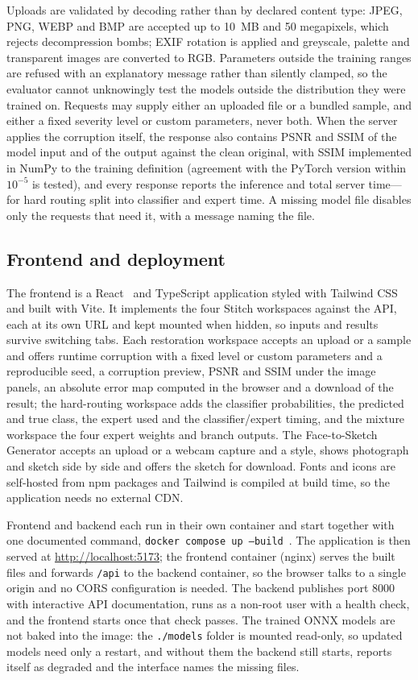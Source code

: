 \documentclass[conference]{IEEEtran}
\begin{document}
Uploads are validated by decoding rather than by declared content type: JPEG,
PNG, WEBP and BMP are accepted up to 10~MB and 50 megapixels, which rejects
decompression bombs; EXIF rotation is applied and greyscale, palette and
transparent images are converted to RGB. Parameters outside the training ranges
are refused with an explanatory message rather than silently clamped, so the
evaluator cannot unknowingly test the models outside the distribution they were
trained on. Requests may supply either an uploaded file or a bundled sample, and
either a fixed severity level or custom parameters, never both. When the server
applies the corruption itself, the response also contains PSNR and SSIM of the
model input and of the output against the clean original, with SSIM implemented
in NumPy to the training definition (agreement with the PyTorch version within
$10^{-5}$ is tested), and every response reports the inference and total server
time---for hard routing split into classifier and expert time. A missing model
file disables only the requests that need it, with a message naming the file.

\subsection{Frontend and deployment}

The frontend is a React~\cite{react} and TypeScript application styled with
Tailwind CSS~\cite{tailwind} and built with Vite. It implements the four Stitch
workspaces against the API, each at its own URL and kept mounted when hidden, so
inputs and results survive switching tabs. Each restoration workspace accepts an
upload or a sample and offers runtime corruption with a fixed level or custom
parameters and a reproducible seed, a corruption preview, PSNR and SSIM under the
image panels, an absolute error map computed in the browser and a download of the
result; the hard-routing workspace adds the classifier probabilities, the
predicted and true class, the expert used and the classifier/expert timing, and
the mixture workspace the four expert weights and branch outputs. The
Face-to-Sketch Generator accepts an upload or a webcam capture and a style, shows
photograph and sketch side by side and offers the sketch for download. Fonts and icons
are self-hosted from npm packages and Tailwind is compiled at build time, so the
application needs no external CDN.

Frontend and backend each run in their own container and start together with one
documented command, \texttt{docker compose up --build}~\cite{dockercompose}. The
application is then served at \url{http://localhost:5173}; the frontend container
(nginx) serves the built files and forwards \texttt{/api} to the backend
container, so the browser talks to a single origin and no CORS configuration is
needed. The backend publishes port 8000 with interactive API documentation, runs
as a non-root user with a health check, and the frontend starts once that check
passes. The trained ONNX models are not baked into the image: the
\texttt{./models} folder is mounted read-only, so updated models need only a
restart, and without them the backend still starts, reports itself as degraded
and the interface names the missing files.
\end{document}
